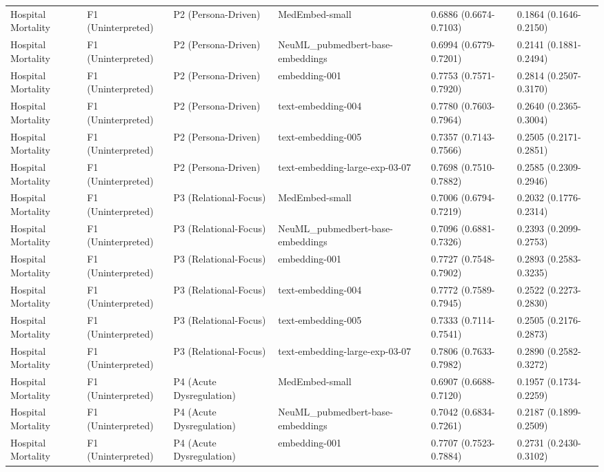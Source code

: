 \begin{tabular}{llllll}
Hospital Mortality & F1 (Uninterpreted) & P2 (Persona-Driven) & MedEmbed-small & 0.6886 (0.6674-0.7103) & 0.1864 (0.1646-0.2150) \\
Hospital Mortality & F1 (Uninterpreted) & P2 (Persona-Driven) & NeuML\_pubmedbert-base-embeddings & 0.6994 (0.6779-0.7201) & 0.2141 (0.1881-0.2494) \\
Hospital Mortality & F1 (Uninterpreted) & P2 (Persona-Driven) & embedding-001 & 0.7753 (0.7571-0.7920) & 0.2814 (0.2507-0.3170) \\
Hospital Mortality & F1 (Uninterpreted) & P2 (Persona-Driven) & text-embedding-004 & 0.7780 (0.7603-0.7964) & 0.2640 (0.2365-0.3004) \\
Hospital Mortality & F1 (Uninterpreted) & P2 (Persona-Driven) & text-embedding-005 & 0.7357 (0.7143-0.7566) & 0.2505 (0.2171-0.2851) \\
Hospital Mortality & F1 (Uninterpreted) & P2 (Persona-Driven) & text-embedding-large-exp-03-07 & 0.7698 (0.7510-0.7882) & 0.2585 (0.2309-0.2946) \\
Hospital Mortality & F1 (Uninterpreted) & P3 (Relational-Focus) & MedEmbed-small & 0.7006 (0.6794-0.7219) & 0.2032 (0.1776-0.2314) \\
Hospital Mortality & F1 (Uninterpreted) & P3 (Relational-Focus) & NeuML\_pubmedbert-base-embeddings & 0.7096 (0.6881-0.7326) & 0.2393 (0.2099-0.2753) \\
Hospital Mortality & F1 (Uninterpreted) & P3 (Relational-Focus) & embedding-001 & 0.7727 (0.7548-0.7902) & 0.2893 (0.2583-0.3235) \\
Hospital Mortality & F1 (Uninterpreted) & P3 (Relational-Focus) & text-embedding-004 & 0.7772 (0.7589-0.7945) & 0.2522 (0.2273-0.2830) \\
Hospital Mortality & F1 (Uninterpreted) & P3 (Relational-Focus) & text-embedding-005 & 0.7333 (0.7114-0.7541) & 0.2505 (0.2176-0.2873) \\
Hospital Mortality & F1 (Uninterpreted) & P3 (Relational-Focus) & text-embedding-large-exp-03-07 & 0.7806 (0.7633-0.7982) & 0.2890 (0.2582-0.3272) \\
Hospital Mortality & F1 (Uninterpreted) & P4 (Acute Dysregulation) & MedEmbed-small & 0.6907 (0.6688-0.7120) & 0.1957 (0.1734-0.2259) \\
Hospital Mortality & F1 (Uninterpreted) & P4 (Acute Dysregulation) & NeuML\_pubmedbert-base-embeddings & 0.7042 (0.6834-0.7261) & 0.2187 (0.1899-0.2509) \\
Hospital Mortality & F1 (Uninterpreted) & P4 (Acute Dysregulation) & embedding-001 & 0.7707 (0.7523-0.7884) & 0.2731 (0.2430-0.3102) \\

\end{tabular}
